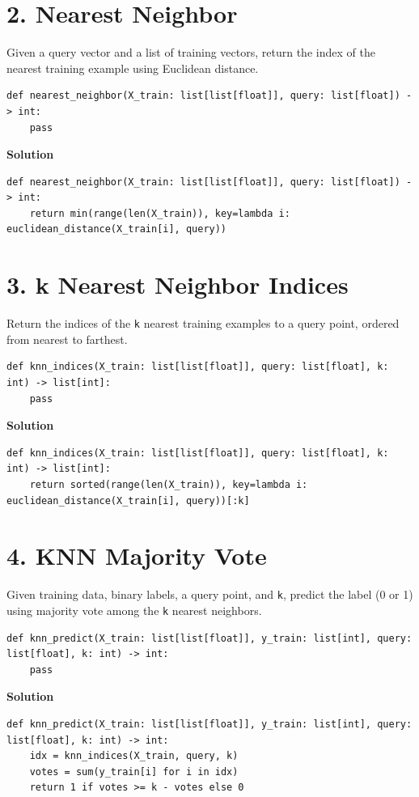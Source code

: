 \documentclass[11pt]{article}
\begin{document}
\section*{2. Nearest Neighbor}
Given a query vector and a list of training vectors, return the index of the nearest training example using Euclidean distance.

\begin{lstlisting}
def nearest_neighbor(X_train: list[list[float]], query: list[float]) -> int:
    pass
\end{lstlisting}

\medskip
\noindent\textbf{Solution}
\begin{lstlisting}
def nearest_neighbor(X_train: list[list[float]], query: list[float]) -> int:
    return min(range(len(X_train)), key=lambda i: euclidean_distance(X_train[i], query))
\end{lstlisting}

\section*{3. k Nearest Neighbor Indices}
Return the indices of the \texttt{k} nearest training examples to a query point, ordered from nearest to farthest.

\begin{lstlisting}
def knn_indices(X_train: list[list[float]], query: list[float], k: int) -> list[int]:
    pass
\end{lstlisting}

\medskip
\noindent\textbf{Solution}
\begin{lstlisting}
def knn_indices(X_train: list[list[float]], query: list[float], k: int) -> list[int]:
    return sorted(range(len(X_train)), key=lambda i: euclidean_distance(X_train[i], query))[:k]
\end{lstlisting}

\section*{4. KNN Majority Vote}
Given training data, binary labels, a query point, and \texttt{k}, predict the label (0 or 1) using majority vote among the \texttt{k} nearest neighbors.

\begin{lstlisting}
def knn_predict(X_train: list[list[float]], y_train: list[int], query: list[float], k: int) -> int:
    pass
\end{lstlisting}

\medskip
\noindent\textbf{Solution}
\begin{lstlisting}
def knn_predict(X_train: list[list[float]], y_train: list[int], query: list[float], k: int) -> int:
    idx = knn_indices(X_train, query, k)
    votes = sum(y_train[i] for i in idx)
    return 1 if votes >= k - votes else 0
\end{lstlisting}
\end{document}

